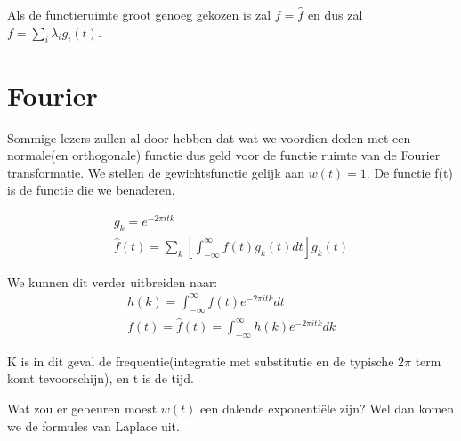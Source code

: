 \documentclass[11pt]{article} %
\begin{document}
Als de functieruimte groot genoeg gekozen is zal $f=\hat{f}$ en dus zal $f = \sum_i \lambda_i g_i(t)$. 

\section{Fourier}
Sommige lezers zullen al door hebben dat wat we voordien deden met een normale(en orthogonale) functie dus geld voor de functie ruimte van de Fourier transformatie. We stellen de gewichtsfunctie gelijk aan $w(t)=1$. De functie f(t) is de functie die we benaderen.

\begin{eqnarray}
	g_k=e^{-2\pi i t k} \\
	\hat{f}(t) =  \sum_k [\int_{-\infty}^{\infty} f(t) g_k(t) dt] g_k(t)
\end{eqnarray}

We kunnen dit verder uitbreiden naar:
\begin{eqnarray}
h(k) =  \int_{-\infty}^{\infty} f(t) e^{-2\pi i t k} dt \\
f(t) = \hat{f}(t) = \int_{-\infty}^{\infty} h(k) e^{-2\pi i t k} dk 
\end{eqnarray}

K is in dit geval de frequentie(integratie met substitutie en de typische $2 \pi$ term komt tevoorschijn), en t is de tijd.

Wat zou er gebeuren moest $w(t)$ een dalende exponentiële zijn? Wel dan komen we de formules van Laplace uit.
\end{document}
